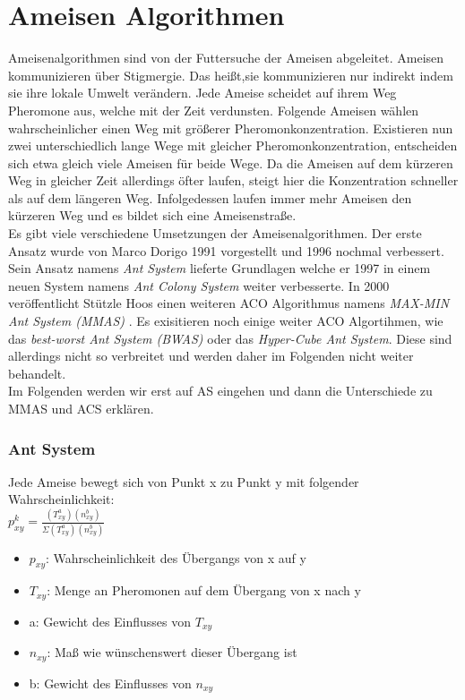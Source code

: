 \section{Ameisen Algorithmen}
Ameisenalgorithmen sind von der Futtersuche der Ameisen abgeleitet. Ameisen kommunizieren über Stigmergie. Das heißt,sie kommunizieren nur indirekt indem sie ihre lokale Umwelt verändern. Jede Ameise scheidet auf ihrem Weg Pheromone aus, welche mit der Zeit verdunsten. 
Folgende Ameisen wählen wahrscheinlicher einen Weg mit größerer Pheromonkonzentration. 
Existieren nun zwei unterschiedlich lange Wege mit gleicher Pheromonkonzentration, entscheiden sich etwa gleich viele Ameisen für beide Wege. 
Da die Ameisen auf dem kürzeren Weg in gleicher Zeit allerdings öfter laufen, steigt hier die Konzentration schneller als auf dem längeren Weg. 
Infolgedessen laufen immer mehr Ameisen den kürzeren Weg und es bildet sich eine Ameisenstraße.\\
Es gibt viele verschiedene Umsetzungen der Ameisenalgorithmen. Der erste Ansatz wurde von Marco Dorigo 1991 vorgestellt\cite{Dorigo1991AntSA} und 1996 nochmal verbessert\cite{484436}.
Sein Ansatz namens \emph{Ant System} lieferte Grundlagen welche er 1997 in einem neuen System namens \emph{Ant Colony System} weiter verbesserte\cite{585892}. In 2000 veröffentlicht Stützle Hoos einen weiteren ACO Algorithmus namens \emph{MAX-MIN Ant System (MMAS)} \cite{STUTZLE2000889}. Es exisitieren noch einige weiter ACO Algortihmen, wie das \emph{best-worst Ant System (BWAS)}\cite{cordon2000new} oder das \emph{Hyper-Cube Ant System}\cite{blum2004hyper}. Diese sind allerdings nicht so verbreitet und werden daher im Folgenden nicht weiter behandelt. \\
Im Folgenden werden wir erst auf AS eingehen und dann die Unterschiede zu MMAS und ACS erklären.
\subsubsection{Ant System}
Jede Ameise bewegt sich von Punkt x zu Punkt y mit folgender Wahrscheinlichkeit: \\

\large$p_{xy}^k=\frac{(T_{xy}^a)(n_{xy}^b)}{\Sigma(T_{xy}^a)(n_{xy}^b) }$
\normalsize
\begin{itemize}
  \item $p_{xy}$: Wahrscheinlichkeit des Übergangs von x auf y
  \item $T_{xy}$: Menge an Pheromonen auf dem Übergang von x nach y 
  \item a: Gewicht des Einflusses von $T_{xy}$
  \item $n_{xy}$: Maß wie wünschenswert dieser Übergang ist
  \item b: Gewicht des Einflusses von $n_{xy}$
\end{itemize}

